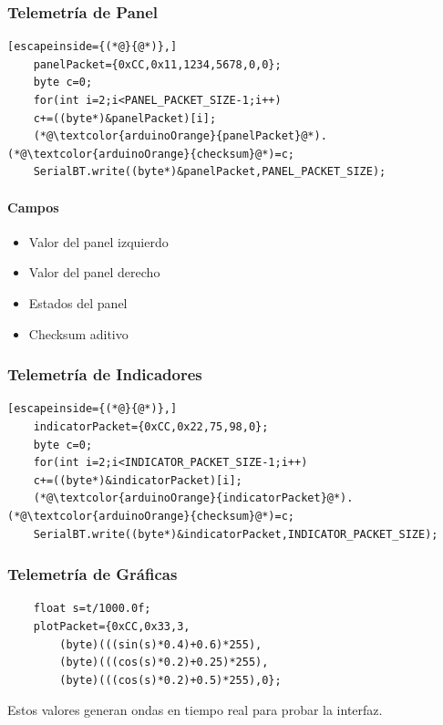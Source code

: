 \documentclass[12pt,a4paper]{article}
\begin{document}
\subsubsection{Telemetría de Panel}

\begin{lstlisting}[escapeinside={(*@}{@*)},]
	panelPacket={0xCC,0x11,1234,5678,0,0};
	byte c=0;
	for(int i=2;i<PANEL_PACKET_SIZE-1;i++)
	c+=((byte*)&panelPacket)[i];
	(*@\textcolor{arduinoOrange}{panelPacket}@*).(*@\textcolor{arduinoOrange}{checksum}@*)=c;
	SerialBT.write((byte*)&panelPacket,PANEL_PACKET_SIZE);
\end{lstlisting}

\paragraph{Campos}

\begin{itemize}
	\item Valor del panel izquierdo
	\item Valor del panel derecho
	\item Estados del panel
	\item Checksum aditivo
\end{itemize}

\subsubsection{Telemetría de Indicadores}

\begin{lstlisting}[escapeinside={(*@}{@*)},]
	indicatorPacket={0xCC,0x22,75,98,0};
	byte c=0;
	for(int i=2;i<INDICATOR_PACKET_SIZE-1;i++)
	c+=((byte*)&indicatorPacket)[i];
	(*@\textcolor{arduinoOrange}{indicatorPacket}@*).(*@\textcolor{arduinoOrange}{checksum}@*)=c;
	SerialBT.write((byte*)&indicatorPacket,INDICATOR_PACKET_SIZE);
\end{lstlisting}

\subsubsection{Telemetría de Gráficas}

\begin{lstlisting}
	float s=t/1000.0f;
	plotPacket={0xCC,0x33,3,
		(byte)(((sin(s)*0.4)+0.6)*255),
		(byte)(((cos(s)*0.2)+0.25)*255),
		(byte)(((cos(s)*0.2)+0.5)*255),0};
\end{lstlisting}

Estos valores generan ondas en tiempo real para probar la interfaz.
\end{document}
